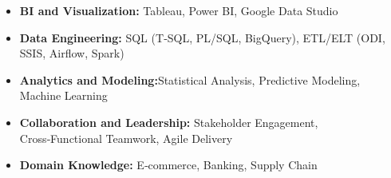 \begin{itemize}[noitemsep, left=0pt]
    \item \textbf{BI and Visualization:} Tableau, Power BI, Google Data Studio
    \item \textbf{Data Engineering:} SQL (T‑SQL, PL/SQL, BigQuery), ETL/ELT (ODI, SSIS, Airflow, Spark)
    \item \textbf{Analytics and Modeling:}Statistical Analysis, Predictive Modeling, Machine Learning
    \item \textbf{Collaboration and Leadership:} Stakeholder Engagement, Cross‑Functional Teamwork, Agile Delivery
    \item \textbf{Domain Knowledge:} E‑commerce, Banking, Supply Chain
\end{itemize}
\vspace{-13pt}